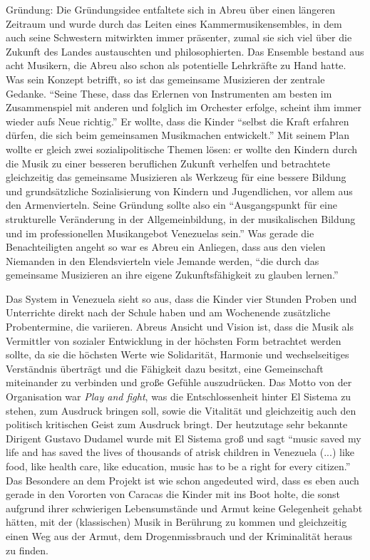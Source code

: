 Gründung: Die Gründungsidee entfaltete sich in Abreu über einen längeren
Zeitraum und wurde durch das Leiten eines Kammermusikensembles, in dem auch
seine Schwestern mitwirkten immer präsenter, zumal sie sich viel über die
Zukunft des Landes austauschten und philosophierten. Das Ensemble bestand aus
acht Musikern, die Abreu also schon als potentielle Lehrkräfte zu Hand hatte.
\autocite[34]{kaufmann:el_sistema} Was sein Konzept betrifft, so ist das
gemeinsame Musizieren der zentrale Gedanke. \enquote{Seine These, dass das
Erlernen von Instrumenten am besten im Zusammenspiel mit anderen und folglich im
Orchester erfolge, scheint ihm immer wieder aufs Neue
richtig.}\autocite[34]{kaufmann:el_sistema} Er wollte, dass die Kinder
\enquote{selbst die Kraft erfahren dürfen, die sich beim gemeinsamen Musikmachen
entwickelt.}\autocite[34]{kaufmann:el_sistema} Mit seinem Plan wollte er gleich
zwei sozialipolitische Themen lösen: er wollte den Kindern durch die Musik zu
einer besseren beruflichen Zukunft verhelfen und betrachtete gleichzeitig das
gemeinsame Musizieren als Werkzeug für eine bessere Bildung und grundsätzliche
Sozialisierung von Kindern und Jugendlichen, vor allem aus den Armenvierteln.
Seine Gründung sollte also ein \enquote{Ausgangspunkt für eine strukturelle
Veränderung in der Allgemeinbildung, in der musikalischen Bildung und im
professionellen Musikangebot Venezuelas sein.}\autocite[38]{kaufmann:el_sistema}
Was gerade die Benachteiligten angeht so war es Abreu ein Anliegen, dass aus den
vielen Niemanden in den Elendsvierteln viele Jemande werden, \enquote{die durch
das gemeinsame Musizieren an ihre eigene Zukunftsfähigkeit zu glauben
lernen.}\autocite[39]{kaufmann:el_sistema}

Das System in Venezuela sieht so aus, dass die Kinder vier Stunden Proben und
Unterrichte direkt nach der Schule haben und am Wochenende zusätzliche
Probentermine, die variieren. Abreus Ansicht und Vision ist, dass die Musik als
Vermittler von sozialer Entwicklung in der höchsten Form betrachtet werden
sollte, da sie die höchsten Werte wie Solidarität, Harmonie und wechselseitiges
Verständnis überträgt und die Fähigkeit dazu besitzt, eine Gemeinschaft
miteinander zu verbinden und große Gefühle auszudrücken. Das Motto von der
Organisation war \emph{Play and fight}, was die Entschlossenheit hinter El
Sistema zu stehen, zum Ausdruck bringen soll, sowie die Vitalität und
gleichzeitig auch den politisch kritischen Geist zum Ausdruck bringt. Der
heutzutage sehr bekannte Dirigent Gustavo Dudamel wurde mit El Sistema groß und
sagt \enquote{music saved my life and has saved the lives of thousands of atrisk
children in Venezuela (...) like food, like health care, like education, music
has to be a right for every citizen.}\autocite{wikipedia:el_sistema} Das
Besondere an dem Projekt ist wie schon angedeuted wird, dass es eben auch gerade
in den Vororten von Caracas die Kinder mit ins Boot holte, die sonst aufgrund
ihrer schwierigen Lebensumstände und Armut keine Gelegenheit gehabt hätten, mit
der (klassischen) Musik in Berührung zu kommen und gleichzeitig einen Weg aus
der Armut, dem Drogenmissbrauch und der Kriminalität heraus zu finden.

